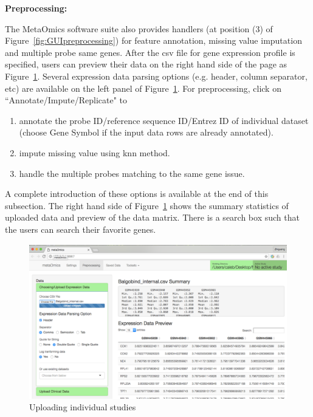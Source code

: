 \begin{steps}
\item \textbf{Preprocessing:}

The MetaOmics software suite also provides handlers (at position {\color{red} (3)} of Figure~\ref{fig:GUIpreprocessing}) for feature annotation, missing value imputation and multiple probe same genes.
After the csv file for gene expression profile is specified, 
users can preview their data on the right hand side of the page as Figure~\ref{fig:GUIpreview}.
Several expression data parsing options (e.g. header, column separator, etc) are available on the left panel of Figure~\ref{fig:GUIpreview}.
For preprocessing, 
click on ``Annotate/Impute/Replicate" to 
\begin{enumerate}
\item annotate the probe ID/reference sequence ID/Entrez ID of individual dataset (choose Gene Symbol if the input data rows are already annotated).
\item impute missing value using knn method.
\item handle the multiple probes matching to the same gene issue.
\end{enumerate}

A complete introduction of these options is available at the end of this subsection.
The right hand side of Figure~\ref{fig:GUIpreview} shows the summary statistics of uploaded data and preview of the data matrix.
There is a search box such that the users can search their favorite genes.

\begin{figure}[H]
\begin{center}
\includegraphics[scale=0.7]{./figure/preprocessing/GUIpreview}
\caption{Uploading individual studies}
\label{fig:GUIpreview}
\end{center}
\end{figure}


\end{steps}
